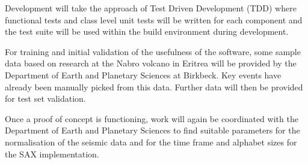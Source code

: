 \documentclass[11pt]{scrartcl}
\begin{document}
	Development will take the approach of Test Driven Development (TDD) where functional tests and class level unit tests will be written for each component and the test suite will be used within the build environment during development.
	
	For training and initial validation of the usefulness of the software, some sample data based on research at the Nabro volcano in Eritrea will be provided by the Department of Earth and Planetary Sciences at Birkbeck.  Key events have already been manually picked from this data.  Further data will then be provided for test set validation.
	
	Once a proof of concept is functioning, work will again be coordinated with the Department of Earth and Planetary Sciences to find suitable parameters for the normalisation of the seismic data and for the time frame and alphabet sizes for the SAX implementation.


\end{document}
